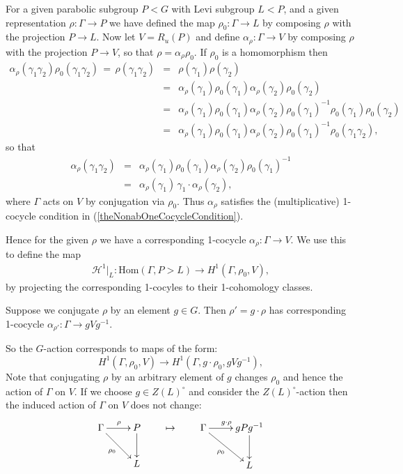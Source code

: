 For a given parabolic subgroup $P<G$ with Levi subgroup $L<P$, and a given representation $\rho:\Gamma\rightarrow P$ we have defined the map $\rho_0:\Gamma\rightarrow L$ by composing $\rho$ with the projection $P\rightarrow L$. Now let $V = R_u(P)$ and define $\alpha_\rho:\Gamma\rightarrow V$ by composing $\rho$ with the projection $P\rightarrow V$, so that $\rho = \alpha_\rho\rho_0$. If $\rho_0$ is a homomorphism then
\begin{eqnarray*}
	\alpha_\rho(\gamma_1\gamma_2)\rho_0(\gamma_1\gamma_2) \,=\, \rho(\gamma_1\gamma_2) 
		&=& \rho(\gamma_1)\rho(\gamma_2) \\
		&=& \alpha_\rho(\gamma_1)\rho_0(\gamma_1)\alpha_\rho(\gamma_2)\rho_0(\gamma_2) \\
		&=& \alpha_\rho(\gamma_1)\rho_0(\gamma_1)\alpha_\rho(\gamma_2)\rho_0(\gamma_1)^{-1}\rho_0(\gamma_1)\rho_0(\gamma_2)\\
		&=&\alpha_\rho(\gamma_1)\rho_0(\gamma_1)\alpha_\rho(\gamma_2)\rho_0(\gamma_1)^{-1}\rho_0(\gamma_1\gamma_2),
\end{eqnarray*}
so that
\begin{eqnarray*}
	\alpha_\rho(\gamma_1\gamma_2) &=&
	\alpha_\rho(\gamma_1)\rho_0(\gamma_1)\alpha_\rho(\gamma_2)\rho_0(\gamma_1)^{-1}\\
	&=& \alpha_\rho(\gamma_1)\,\gamma_1\cdot\alpha_\rho(\gamma_2),
\end{eqnarray*}
where $\Gamma$ acts on $V$ by conjugation via $\rho_0$. Thus $\alpha_\rho$ satisfies the (multiplicative) 1-cocycle condition in (\ref{theNonabOneCocycleCondition}).

Hence for the given $\rho$ we have a corresponding 1-cocycle $\alpha_\rho:\Gamma\rightarrow V$. We use this to define the map
\begin{eqnarray}\label{repToH1}
	\mathcal{H}^1|_L:\mathrm{Hom}(\Gamma, P>L) \rightarrow H^1(\Gamma, \rho_0, V),
\end{eqnarray}
by projecting the corresponding 1-cocyles to their 1-cohomology classes.

Suppose we conjugate $\rho$ by an element $g\in G$. Then $\rho'=g\cdot\rho$ has corresponding 1-cocycle $\alpha_{\rho'}:\Gamma\rightarrow gVg^{-1}$.

So the $G$-action corresponds to maps of the form:
\begin{displaymath}
	H^1(\Gamma, \rho_0, V)\rightarrow H^1(\Gamma, g\cdot\rho_0, gVg^{-1}),
\end{displaymath}
Note that conjugating $\rho$ by an arbitrary element of $g$ changes $\rho_0$ and hence the action of $\Gamma$ on $V$. If we choose $g\in Z(L)^\circ$ and consider the $Z(L)^\circ$-action then the induced action of $\Gamma$ on $V$ does not change:
\begin{displaymath}
	\xymatrix{
		\Gamma \ar[r]^{\rho} \ar[rd]_{\rho_0} & P \ar[d]\\
		& L} \qquad\mapsto\qquad
	\xymatrix{
		\Gamma \ar[r]^{g\cdot\rho} \ar[rd]_{\rho_0} & gPg^{-1} \ar[d]\\
		& L}
\end{displaymath} 


